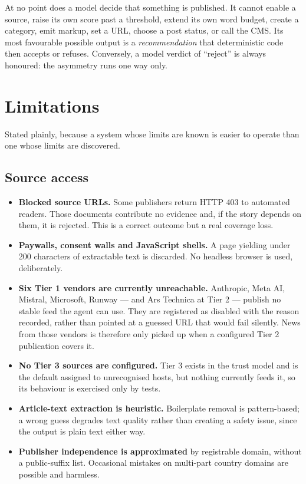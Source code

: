 \documentclass[11pt,a4paper]{article}
\begin{document}
\begin{blockbox}
At no point does a model decide that something is published. It cannot enable a
source, raise its own score past a threshold, extend its own word budget, create a
category, emit markup, set a URL, choose a post status, or call the CMS. Its most
favourable possible output is a \emph{recommendation} that deterministic code then
accepts or refuses. Conversely, a model verdict of ``reject'' is always honoured:
the asymmetry runs one way only.
\end{blockbox}

\section{Limitations}

Stated plainly, because a system whose limits are known is easier to operate than
one whose limits are discovered.

\subsection{Source access}

\begin{itemize}[leftmargin=1.2em,itemsep=0.25em]
  \item \textbf{Blocked source URLs.} Some publishers return HTTP 403 to automated
    readers. Those documents contribute no evidence and, if the story depends on
    them, it is rejected. This is a correct outcome but a real coverage loss.
  \item \textbf{Paywalls, consent walls and JavaScript shells.} A page yielding
    under 200 characters of extractable text is discarded. No headless browser is
    used, deliberately.
  \item \textbf{Six Tier 1 vendors are currently unreachable.} Anthropic, Meta AI,
    Mistral, Microsoft, Runway --- and Ars Technica at Tier 2 --- publish no stable
    feed the agent can use. They are registered as disabled with the reason
    recorded, rather than pointed at a guessed URL that would fail silently. News
    from those vendors is therefore only picked up when a configured Tier 2
    publication covers it.
  \item \textbf{No Tier 3 sources are configured.} Tier 3 exists in the trust model
    and is the default assigned to unrecognised hosts, but nothing currently feeds
    it, so its behaviour is exercised only by tests.
  \item \textbf{Article-text extraction is heuristic.} Boilerplate removal is
    pattern-based; a wrong guess degrades text quality rather than creating a
    safety issue, since the output is plain text either way.
  \item \textbf{Publisher independence is approximated} by registrable domain,
    without a public-suffix list. Occasional mistakes on multi-part country domains
    are possible and harmless.
\end{itemize}
\end{document}
